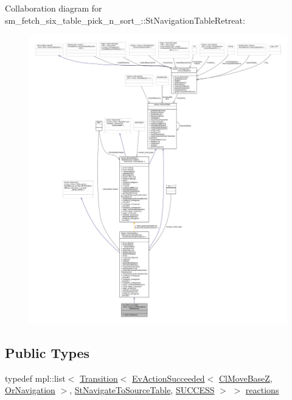 Collaboration diagram for sm\+\_\+fetch\+\_\+six\+\_\+table\+\_\+pick\+\_\+n\+\_\+sort\+\_\+:\+:St\+Navigation\+Table\+Retreat\+:
\nopagebreak
\begin{figure}[H]
\begin{center}
\leavevmode
\includegraphics[width=350pt]{structsm__fetch__six__table__pick__n__sort__1_1_1StNavigationTableRetreat__coll__graph}
\end{center}
\end{figure}
\subsection*{Public Types}
\begin{DoxyCompactItemize}
\item 
typedef mpl\+::list$<$ \hyperlink{classsmacc_1_1Transition}{Transition}$<$ \hyperlink{structsmacc_1_1default__events_1_1EvActionSucceeded}{Ev\+Action\+Succeeded}$<$ \hyperlink{classcl__move__base__z_1_1ClMoveBaseZ}{Cl\+Move\+BaseZ}, \hyperlink{classsm__fetch__six__table__pick__n__sort__1_1_1OrNavigation}{Or\+Navigation} $>$, \hyperlink{structsm__fetch__six__table__pick__n__sort__1_1_1StNavigateToSourceTable}{St\+Navigate\+To\+Source\+Table}, \hyperlink{structsmacc_1_1default__transition__tags_1_1SUCCESS}{S\+U\+C\+C\+E\+SS} $>$ $>$ \hyperlink{structsm__fetch__six__table__pick__n__sort__1_1_1StNavigationTableRetreat_a012105d61d76a0da83607b5910d8f710}{reactions}
\end{DoxyCompactItemize}
